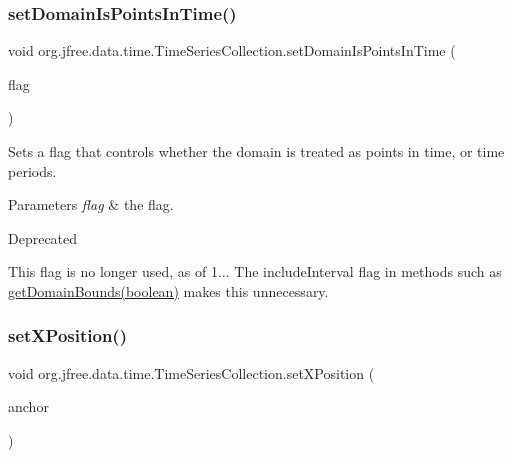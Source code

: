 \subsubsection{\texorpdfstring{set\+Domain\+Is\+Points\+In\+Time()}{setDomainIsPointsInTime()}}
{\footnotesize\ttfamily void org.\+jfree.\+data.\+time.\+Time\+Series\+Collection.\+set\+Domain\+Is\+Points\+In\+Time (\begin{DoxyParamCaption}\item[{boolean}]{flag }\end{DoxyParamCaption})}

Sets a flag that controls whether the domain is treated as \textquotesingle{}points in time\textquotesingle{}, or time periods.


\begin{DoxyParams}{Parameters}
{\em flag} & the flag.\\
\hline
\end{DoxyParams}
\begin{DoxyRefDesc}{Deprecated}
\item[\mbox{\hyperlink{deprecated__deprecated000283}{Deprecated}}]This flag is no longer used, as of 1... The {\ttfamily include\+Interval} flag in methods such as \mbox{\hyperlink{classorg_1_1jfree_1_1data_1_1time_1_1_time_series_collection_a3d78b109c0a1f7a9795f8c5108613084}{get\+Domain\+Bounds(boolean)}} makes this unnecessary. \end{DoxyRefDesc}
\mbox{\label{classorg_1_1jfree_1_1data_1_1time_1_1_time_series_collection_a7a055bdd005738c08405ceb646df0113}} 
\subsubsection{\texorpdfstring{set\+X\+Position()}{setXPosition()}}
{\footnotesize\ttfamily void org.\+jfree.\+data.\+time.\+Time\+Series\+Collection.\+set\+X\+Position (\begin{DoxyParamCaption}\item[{\mbox{\hyperlink{classorg_1_1jfree_1_1data_1_1time_1_1_time_period_anchor}{Time\+Period\+Anchor}}}]{anchor }\end{DoxyParamCaption})}

